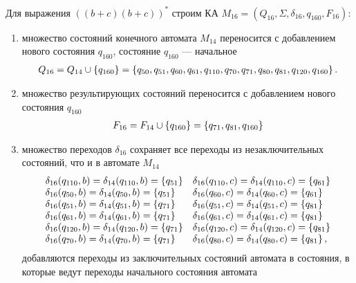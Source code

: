 \newpage
Для выражения \(((b+c)(b+c))^*\) строим КА \(M_{16} = (Q_{16}, \Sigma, \delta_{16}, q_{160}, F_{16})\):
\begin{enumerate}
	\item множество состояний конечного автомата \(M_{14}\) переносится с добавлением нового состояния \(q_{160}\), состояние \(q_{160}\) --- начальное
	      \begin{align*}
		      Q_{16} = Q_{14} \cup \left\{q_{160}\right\} =\left\{q_{50}, q_{51}, q_{60}, q_{61}, q_{110}, q_{70}, q_{71}, q_{80}, q_{81}, q_{120}, q_{160}\right\}.
	      \end{align*}
	\item множество результирующих состояний переносится с добавлением нового состояния \(q_{160}\)
	      \begin{align*}
		      F_{16} = F_{14} \cup \left\{q_{160}\right\} = \left\{q_{71}, q_{81}, q_{160}\right\}
	      \end{align*}
	\item множество переходов \(\delta_{16}\) сохраняет все переходы из незаключительных состояний, что и в автомате \(M_{14}\)
	      \begin{align*}
		      \begin{array}{ll}
			      \delta_{16}(q_{110}, b) = \delta_{14}(q_{110}, b) = \left\{q_{51}\right\} & \delta_{16}(q_{110}, c) = \delta_{14}(q_{110}, c) = \left\{q_{61}\right\} \\
			      \delta_{16}(q_{50}, b)  = \delta_{14}(q_{50}, b)  = \left\{q_{51}\right\} & \delta_{16}(q_{60}, c)  = \delta_{14}(q_{60}, c)  = \left\{q_{61}\right\} \\
			      \delta_{16}(q_{51}, b)  = \delta_{14}(q_{51}, b)  = \left\{q_{71}\right\} & \delta_{16}(q_{51}, c)  = \delta_{14}(q_{51}, c)  = \left\{q_{81}\right\} \\
			      \delta_{16}(q_{61}, b)  = \delta_{14}(q_{61}, b)  = \left\{q_{71}\right\} & \delta_{16}(q_{61}, c)  = \delta_{14}(q_{61}, c)  = \left\{q_{81}\right\} \\
			      \delta_{16}(q_{120}, b) = \delta_{14}(q_{120}, b) = \left\{q_{71}\right\} & \delta_{16}(q_{120}, c) = \delta_{14}(q_{120}, c) = \left\{q_{81}\right\} \\
			      \delta_{16}(q_{70}, b)  = \delta_{14}(q_{70}, b) = \left\{q_{71}\right\}  & \delta_{16}(q_{80}, c) =  \delta_{14}(q_{80}, c) = \left\{q_{81}\right\},
		      \end{array}
	      \end{align*}
	      добавляются переходы из заключительных состояний автомата в состояния, в которые ведут переходы начального состояния автомата
	      \begin{align*}

\end{align*}
\end{enumerate}
